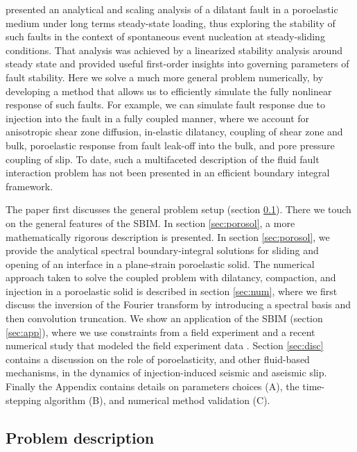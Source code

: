 \documentclass[draft]{agujournal2019}
\begin{document}
 presented an analytical and scaling analysis of a dilatant fault in a poroelastic medium under long terms steady-state loading, thus exploring the stability of such faults in the context of spontaneous event nucleation at steady-sliding conditions. That analysis was achieved by a linearized stability analysis around steady state and provided useful first-order insights into governing parameters of fault stability. Here we solve a much more general problem numerically, by developing a method that allows us to efficiently simulate the fully nonlinear response of such faults. For example, we can simulate fault response due to injection into the fault in a fully coupled manner, where we account for anisotropic shear zone diffusion, in-elastic dilatancy, coupling of shear zone and bulk, poroelastic response from fault leak-off into the bulk, and pore pressure coupling of slip. To date, such a multifaceted description of the fluid fault interaction problem has not been presented in an efficient boundary integral framework. 
 
The paper first discusses the general problem setup (section \ref{sec:problem}). There we touch on the general features of the SBIM. In section \ref{sec:porosol}, a more mathematically rigorous description is presented. In section \ref{sec:porosol}, we provide the analytical spectral boundary-integral solutions for sliding and opening of an interface in a plane-strain poroelastic solid. The numerical approach taken to solve the coupled problem with dilatancy, compaction, and injection in a poroelastic solid is described in section \ref{sec:num}, where we first discuss the inversion of the Fourier transform by introducing a spectral basis and then convolution truncation. We show an application of the SBIM (section \ref{sec:app}), where we use constraints from a field experiment \cite{Guglielmi2015} and a recent numerical study that modeled the field experiment data \cite{Larochelle2021}. Section \ref{sec:disc} contains a discussion on the role of poroelasticity, and other fluid-based mechanisms, in the dynamics of injection-induced seismic and aseismic slip. Finally the Appendix contains details on parameters choices (A), the time-stepping algorithm (B), and numerical method validation (C).

\subsection{Problem description} \label{sec:problem}
\end{document}
